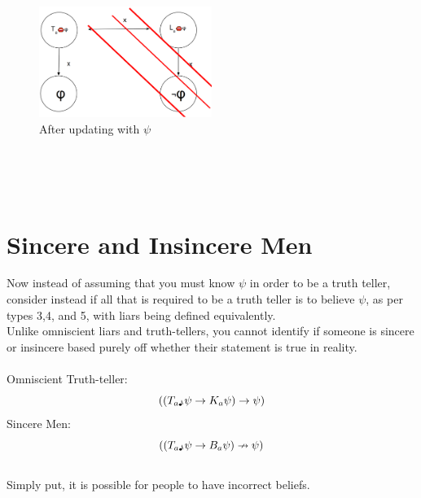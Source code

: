 \documentclass[12pt, titlepage, twoside]{report}
\begin{document}
\begin{figure}[h!]
  \centering
  \includegraphics[width=0.5\textwidth]{slide11.eps}
  \caption{After updating with $\psi$}
\end{figure}\\
\\
\\

\section{Sincere and Insincere Men}
Now instead of assuming that you must know $\psi$ in order to be a truth teller, consider instead if all that is required to be a truth teller is to believe $\psi$, as per types 3,4, and 5, with liars being defined equivalently.\\
Unlike omniscient liars and truth-tellers, you cannot identify if someone is sincere or insincere based purely off whether their statement is true in reality.\\
\\
Omniscient Truth-teller:
$$((T_{a \text{\textmusicalnote}} \psi \to K_a \psi)\to \psi)$$
Sincere Men:
$$((T_{a \text{\textmusicalnote}} \psi \to B_a \psi)\nrightarrow \psi)$$ \\
Simply put, it is possible for people to have incorrect beliefs.
\end{document}
